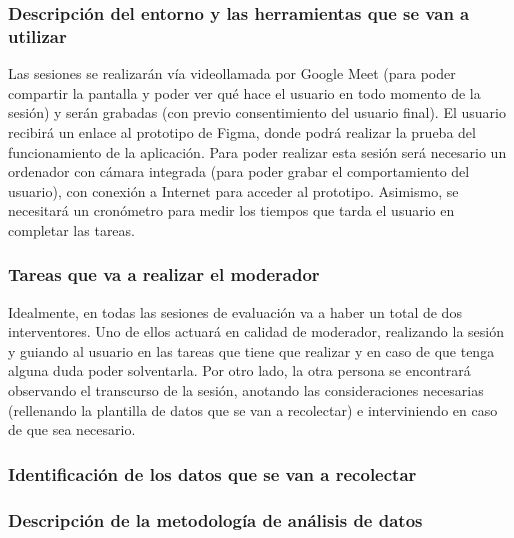\subsubsection{Descripción del entorno y las herramientas que se van a utilizar}
Las sesiones se realizarán vía videollamada por Google Meet (para poder compartir la pantalla y poder ver qué hace el usuario en todo momento de la sesión) y 
serán grabadas (con previo consentimiento del usuario final). El usuario recibirá un enlace al prototipo de Figma, donde podrá realizar la prueba del funcionamiento 
de la aplicación. Para poder realizar esta sesión será necesario un ordenador con cámara integrada (para poder grabar el comportamiento del usuario), con conexión 
a Internet para acceder al prototipo. Asimismo, se necesitará un cronómetro para medir los tiempos que tarda el usuario en completar las tareas.

\subsubsection{Tareas que va a realizar el moderador}
Idealmente, en todas las sesiones de evaluación va a haber un total de dos interventores. Uno de ellos actuará en calidad de moderador, realizando la sesión 
y guiando al usuario en las tareas que tiene que realizar y en caso de que tenga alguna duda poder solventarla. Por otro lado, la otra persona se encontrará 
observando el transcurso de la sesión, anotando las consideraciones necesarias (rellenando la plantilla de datos que se van a recolectar) e interviniendo en 
caso de que sea necesario.

\subsubsection{Identificación de los datos que se van a recolectar}

\subsubsection{Descripción de la metodología de análisis de datos}